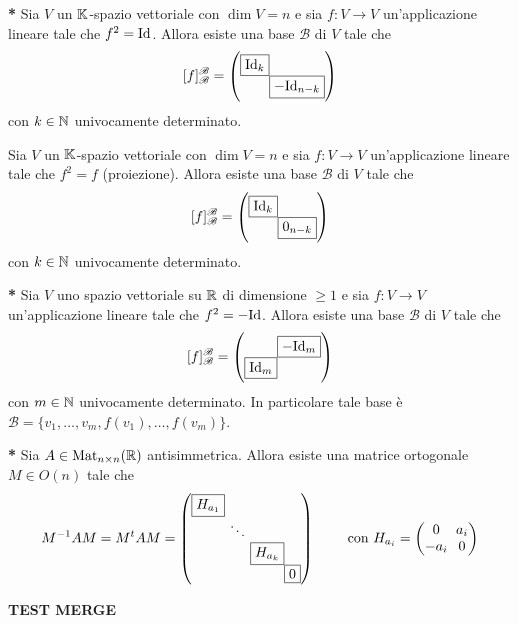 
\begin{thm} \textbf{*}
	Sia $ V $ un $ \mathbb{K} $-spazio vettoriale con $ \dim{V} = n $ e sia $ f \colon V \to V $ un'applicazione lineare tale che $ f^{2} = \mathrm{Id} $. Allora esiste una base $ \mathscr{B} $ di $ V $ tale che 
	\[[f]_{\mathscr{B}}^{\mathscr{B}} = 
	\setlength{\arraycolsep}{0pt}
	\begin{pmatrix}
	\fbox{$ \Id_k $} & \\
	& \fbox{$ -\Id_{n - k} $}
	\end{pmatrix}\]
	con $ k \in \mathbb{N} $ univocamente determinato.
\end{thm}

\begin{thm}
	Sia $ V $ un $ \mathbb{K} $-spazio vettoriale con $ \dim{V} = n $ e sia $ f \colon V \to V $ un'applicazione lineare tale che $ f^{2} = f $ (proiezione). Allora esiste una base $ \mathscr{B} $ di $ V $ tale che 
	\[[f]_{\mathscr{B}}^{\mathscr{B}} = 
	\setlength{\arraycolsep}{0pt}
	\begin{pmatrix}
	\fbox{$ \Id_k $} & \\
	& \fbox{$ 0_{n - k} $}
	\end{pmatrix}\]
	con $ k \in \mathbb{N} $ univocamente determinato.
\end{thm}

\begin{thm} \textbf{*}
	Sia $ V $ uno spazio vettoriale su $ \mathbb{R} $ di dimensione $ \geq 1 $ e sia $ f \colon V \to V $ un'applicazione lineare tale che $ f^{2} = - \mathrm{Id} $. Allora esiste una base $ \mathscr{B} $ di $ V $ tale che 
	\[[f]_{\mathscr{B}}^{\mathscr{B}} = 
	\setlength{\arraycolsep}{0pt}
	\begin{pmatrix}
	& \fbox{$ -\Id_m $}\\
	\fbox{$ \Id_m $} & 
	\end{pmatrix}\]
	con $ m \in \mathbb{N} $ univocamente determinato. In particolare tale base è $ \mathscr{B} = \{v_1, \ldots, v_m, f(v_1), \ldots, f(v_m)\} $.
\end{thm}

\begin{thm} \textbf{*}
	Sia $ A \in \mathrm{Mat}_{n \times n}(\mathbb{R}) $ antisimmetrica. Allora esiste una matrice ortogonale $ M \in O(n) $ tale che 
	\[M^{-1} A M = M^{t} A M = 
	\setlength{\arraycolsep}{0pt}
	\begin{pmatrix}
	\fbox{$ H_{a_1} $} & & &\\
	& \ \ddots \ & & \\
	& & \fbox{$ H_{a_k} $} & \\
	& & & \fbox{$ 0 $}
	\end{pmatrix}
	\qquad
	\text{ con }
	H_{a_i} = 
	\setlength{\arraycolsep}{3pt}
	\begin{pmatrix}
	0 & a_{i} \\
	-a_{i} & 0
	\end{pmatrix}\]
\end{thm}

\hspace{5cm}
\begin{center}
	\textbf{TEST MERGE}
\end{center}